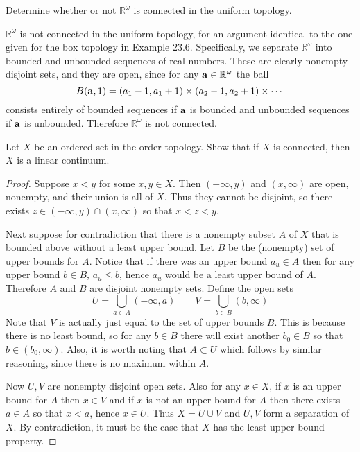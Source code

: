 \documentclass[11pt]{article}
\begin{document}
\begin{ex}{23.8}
  Determine whether or not $\mathbb{R}^\omega$ is connected in the uniform
  topology.
\end{ex}

\begin{solution}
  $\mathbb{R}^\omega$ is not connected in the uniform topology, for an argument
  identical to the one given for the box topology in Example 23.6. Specifically,
  we separate $\mathbb{R}^\omega$ into bounded and unbounded sequences of real
  numbers. These are clearly nonempty disjoint sets, and they are open, since
  for any $\vb a \in \mathbb{R}^\omega$ the ball
  \[ B(\vb a, 1) = (a_1 - 1, a_1 + 1) \times (a_2 - 1, a_2 + 1) \times \cdots \]
  consists entirely of bounded sequences if $\vb a$ is bounded and unbounded
  sequences if $\vb a$ is unbounded. Therefore $\mathbb{R}^\omega$ is not
  connected.
\end{solution}

\begin{ex}{24.4}
  Let $X$ be an ordered set in the order topology. Show that if $X$ is
  connected, then $X$ is a linear continuum.
\end{ex}

\begin{proof}
  Suppose $x < y$ for some $x,y \in X$. Then $(-\infty, y)$ and $(x, \infty)$
  are open, nonempty, and their union is all of $X$. Thus they cannot be
  disjoint, so there exists $z \in (-\infty, y) \cap (x, \infty)$ so that $x < z
  < y$.

  Next suppose for contradiction that there is a nonempty subset $A$ of $X$ that
  is bounded above without a least upper bound. Let $B$ be the (nonempty) set of
  upper bounds for $A$. Notice that if there was an upper bound $a_u \in A$ then
  for any upper bound $b \in B$, $a_u \leq b$, hence $a_u$ would be a least
  upper bound of $A$. Therefore $A$ and $B$ are disjoint nonempty sets. Define
  the open sets
  \[U = \bigcup_{a \in A} (-\infty, a) \quad\quad V = \bigcup_{b \in B} (b,
    \infty) \]
  Note that $V$ is actually just equal to
  the set of upper bounds $B$. This is because there is no least bound, so for
  any $b \in B$ there will exist another $b_0 \in B$ so that $b \in (b_0, \infty)$. Also, it
  is worth noting that $A \subset U$ which follows by similar reasoning, since
  there is no maximum within $A$.

  Now $U, V$ are nonempty disjoint open sets. Also for any $x \in X$, if $x$ is an
  upper bound for $A$ then $x \in V$ and if $x$ is not an upper bound for $A$
  then there exists $a \in A$ so that $x < a$, hence $x \in U$. Thus $X = U \cup
  V$ and $U,V$ form a separation of $X$. By contradiction, it must be the case
  that $X$ has the least upper bound property.
\end{proof}
\end{document}
